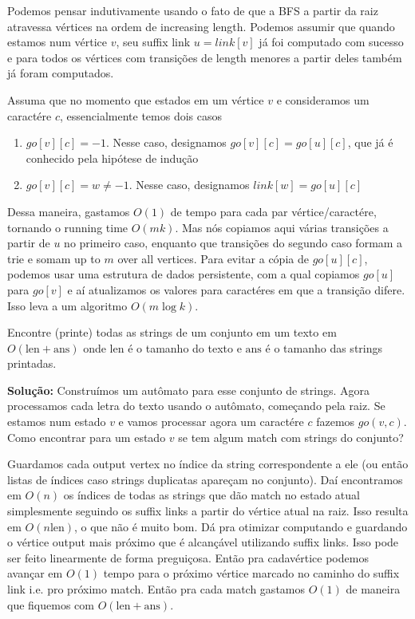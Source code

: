 Podemos pensar indutivamente usando o fato de que a BFS a partir da raiz atravessa vértices na ordem de increasing length. Podemos assumir que quando estamos num vértice $v$, seu suffix link $u = link[v]$ já foi computado com sucesso e para todos os vértices com transições de length menores a partir deles também já foram computados.

Assuma que no momento que estados em um vértice $v$ e consideramos um caractére $c$, essencialmente temos dois casos

\begin{enumerate}
    \item $go[v][c] = -1$. Nesse caso, designamos $go[v][c] = go[u][c]$, que já é conhecido pela hipótese de indução
    \item $go[v][c] = w \neq -1$. Nesse caso, designamos $link[w] = go[u][c]$
\end{enumerate}

Dessa maneira, gastamos $O(1)$ de tempo para cada par vértice/caractére, tornando o running time $O(mk)$. Mas nós copiamos aqui várias transições a partir de $u$ no primeiro caso, enquanto que transições do segundo caso formam a trie e somam up to $m$ over all vertices. Para evitar a cópia de $go[u][c]$, podemos usar uma estrutura de dados persistente, com a qual copiamos $go[u]$ para $go[v]$ e aí atualizamos os valores para caractéres em que a transição difere. Isso leva a um algoritmo $O(m \log k)$.

 Encontre (printe) todas as strings de um conjunto em um texto em $O(\text{len} + \text{ans})$ onde $\text{len}$ é o tamanho do texto e $\text{ans}$ é o tamanho das strings printadas.

\textbf{Solução:} Construímos um autômato para esse conjunto de strings. Agora processamos cada letra do texto usando o autômato, começando pela raiz. Se estamos num estado $v$ e vamos processar agora um caractére $c$ fazemos $go(v, c)$. Como encontrar para um estado $v$ se tem algum match com strings do conjunto? 

Guardamos cada output vertex no índice da string correspondente a ele (ou então listas de índices caso strings duplicatas apareçam no conjunto). Daí encontramos em $O(n)$ os índices de todas as strings que dão match no estado atual simplesmente seguindo os suffix links a partir do vértice atual na raiz. Isso resulta em $O(n \text{len})$, o que não é muito bom. Dá pra otimizar computando e guardando o vértice output mais próximo que é alcançável utilizando suffix links. Isso pode ser feito linearmente de forma preguiçosa. Então pra cadavértice podemos avançar em $O(1)$ tempo para o próximo vértice marcado no caminho do suffix link i.e. pro próximo match. Então pra cada match gastamos $O(1)$ de maneira que fiquemos com $O( \text{len} + \text{ans})$.

